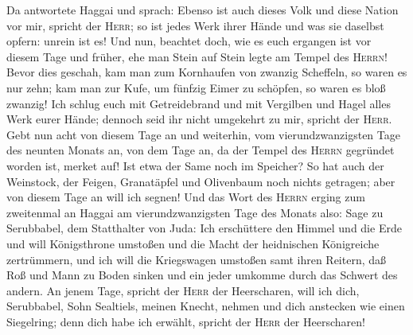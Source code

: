  Da antwortete Haggai und sprach: Ebenso ist auch dieses
Volk und diese Nation vor mir, spricht der \textsc{Herr}; so ist jedes
Werk ihrer Hände und was sie daselbst opfern: unrein ist es!
 Und nun, beachtet doch, wie es euch ergangen ist vor
diesem Tage und früher, ehe man Stein auf Stein legte am Tempel des
\textsc{Herrn}!  Bevor dies geschah, kam man zum
Kornhaufen von zwanzig Scheffeln, so waren es nur zehn; kam man zur
Kufe, um fünfzig Eimer zu schöpfen, so waren es bloß zwanzig!
 Ich schlug euch mit Getreidebrand und mit Vergilben und
Hagel alles Werk eurer Hände; dennoch seid ihr nicht umgekehrt zu mir,
spricht der \textsc{Herr}.  Gebt nun acht von diesem Tage
an und weiterhin, vom vierundzwanzigsten Tage des neunten Monats an, von
dem Tage an, da der Tempel des \textsc{Herrn} gegründet worden ist,
merket auf!  Ist etwa der Same noch im Speicher? So hat
auch der Weinstock, der Feigen, Granatäpfel und Olivenbaum noch nichts
getragen; aber von diesem Tage an will ich segnen!  Und
das Wort des \textsc{Herrn} erging zum zweitenmal an Haggai am
vierundzwanzigsten Tage des Monats also:  Sage zu
Serubbabel, dem Statthalter von Juda: Ich erschüttere den Himmel und die
Erde  und will Königsthrone umstoßen und die Macht der
heidnischen Königreiche zertrümmern, und ich will die Kriegswagen
umstoßen samt ihren Reitern, daß Roß und Mann zu Boden sinken und ein
jeder umkomme durch das Schwert des andern.  An jenem
Tage, spricht der \textsc{Herr} der Heerscharen, will ich dich,
Serubbabel, Sohn Sealtiels, meinen Knecht, nehmen und dich anstecken wie
einen Siegelring; denn dich habe ich erwählt, spricht der \textsc{Herr}
der Heerscharen!
